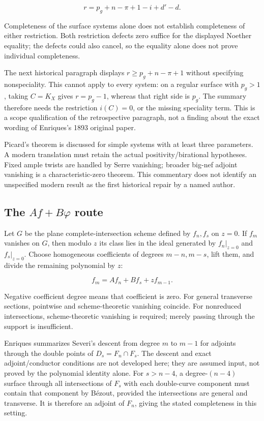 \[
r=p_g+n-\pi+1-i+d'-d.
\]

Completeness of the surface systems alone does not establish completeness of either restriction. Both restriction defects zero suffice for the displayed Noether equality; the defects could also cancel, so the equality alone does not prove individual completeness.

The next historical paragraph displays \(r\ge p_g+n-\pi+1\) without specifying nonspeciality. This cannot apply to every system: on a regular surface with \(p_g>1\), taking \(C=K_X\) gives \(r=p_g-1\), whereas that right side is \(p_g\). The summary therefore needs the restriction \(i(C)=0\), or the missing speciality term. This is a scope qualification of the retrospective paragraph, not a finding about the exact wording of Enriques's 1893 original paper.

Picard's theorem is discussed for simple systems with at least three parameters. A modern translation must retain the actual positivity/birational hypotheses. Fixed ample twists are handled by Serre vanishing; broader big-nef adjoint vanishing is a characteristic-zero theorem. This commentary does not identify an unspecified modern result as the first historical repair by a named author.

\subsection{\texorpdfstring{The \(Af+B\varphi\) route}{The Af+B\textbackslash varphi route}}

Let \(G\) be the plane complete-intersection scheme defined by \(f_n,f_s\) on \(z=0\). If \(f_m\) vanishes on \(G\), then modulo \(z\) its class lies in the ideal generated by \(f_n|_{z=0}\) and \(f_s|_{z=0}\). Choose homogeneous coefficients of degrees \(m-n,m-s\), lift them, and divide the remaining polynomial by \(z\):

\[
f_m=Af_n+Bf_s+zf_{m-1}.
\]

Negative coefficient degree means that coefficient is zero. For general transverse sections, pointwise and scheme-theoretic vanishing coincide. For nonreduced intersections, scheme-theoretic vanishing is required; merely passing through the support is insufficient.

Enriques summarizes Severi's descent from degree \(m\) to \(m-1\) for adjoints through the double points of \(D_s=F_n\cap F_s\). The descent and exact adjoint/conductor conditions are not developed here; they are assumed input, not proved by the polynomial identity alone. For \(s>n-4\), a degree-\((n-4)\) surface through all intersections of \(F_s\) with each double-curve component must contain that component by Bézout, provided the intersections are general and transverse. It is therefore an adjoint of \(F_n\), giving the stated completeness in this setting.

